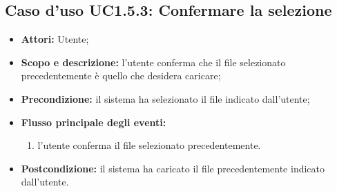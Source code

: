 \subsection{Caso d'uso UC1.5.3: Confermare la selezione}
\begin{itemize}
\item \textbf{Attori:} Utente;
\item \textbf{Scopo e descrizione:} l'utente conferma che il file selezionato precedentemente è quello che desidera caricare;
\item \textbf{Precondizione:} il sistema ha selezionato il file indicato dall'utente;
\item \textbf{Flusso principale degli eventi:}
\begin{enumerate}
\item l'utente conferma il file selezionato precedentemente.
\end{enumerate}
\item \textbf{Postcondizione:} il sistema ha caricato il file precedentemente indicato dall'utente.
\end{itemize}


